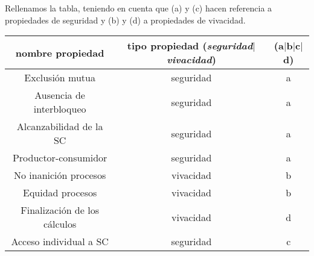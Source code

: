 \documentclass[12pt]{article}
\begin{document}
    \begin{ejercicio}
        Rellenamos la tabla, teniendo en cuenta que (a) y (c) hacen referencia a propiedades de seguridad y (b) y (d) a propiedades de vivacidad.
        \begin{table}[H]
        \centering
        \begin{tabular}{|c|c|c|}
            \hline
            \textbf{nombre propiedad} & \textbf{tipo propiedad} (\textit{seguridad}$|$\textit{vivacidad}) & (\textbf{a}$|$\textbf{b}$|$\textbf{c}$|$\textbf{d}) \\
            \hline
            Exclusión mutua & seguridad & a \\
            \hline
            Ausencia de interbloqueo & seguridad & a \\
            \hline
            Alcanzabilidad de la SC & seguridad & a \\
            \hline
            Productor-consumidor & seguridad & a \\
            \hline
            No inanición procesos & vivacidad & b \\
            \hline
            Equidad procesos & vivacidad & b \\
            \hline
            Finalización de los cálculos & vivacidad & d \\
            \hline
            Acceso individual a SC & seguridad & c \\
            \hline
        \end{tabular}
        \end{table}
    \end{ejercicio}
\end{document}
